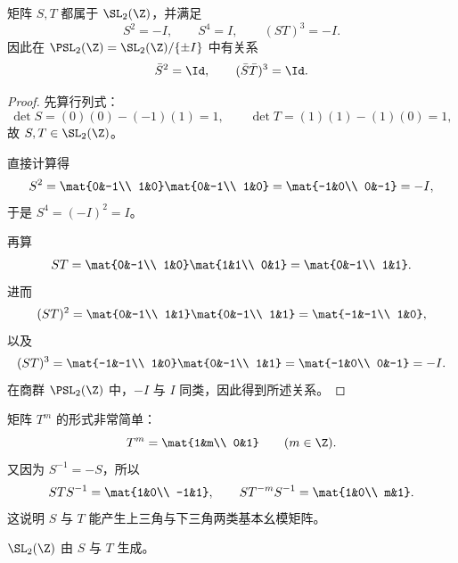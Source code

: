 \begin{proposition}
矩阵 $S,T$ 都属于 $\SL_2(\Z)$，并满足
\[
S^2=-I,
\qquad
S^4=I,
\qquad
(ST)^3=-I.
\]
因此在 $\PSL_2(\Z)=\SL_2(\Z)/\{\pm I\}$ 中有关系
\[
\bar S^2=\Id,
\qquad
(\bar S\bar T)^3=\Id.
\]
\end{proposition}

\begin{proof}
先算行列式：
\[
\det S=(0)(0)-(-1)(1)=1,
\qquad
\det T=(1)(1)-(1)(0)=1,
\]
故 $S,T\in \SL_2(\Z)$。

直接计算得
\[
S^2=
\mat{0&-1\\ 1&0}
\mat{0&-1\\ 1&0}
=
\mat{-1&0\\ 0&-1}
=-I,
\]
于是 $S^4=(-I)^2=I$。

再算
\[
ST=
\mat{0&-1\\ 1&0}
\mat{1&1\\ 0&1}
=
\mat{0&-1\\ 1&1}.
\]
进而
\[
(ST)^2=
\mat{0&-1\\ 1&1}
\mat{0&-1\\ 1&1}
=
\mat{-1&-1\\ 1&0},
\]
以及
\[
(ST)^3=
\mat{-1&-1\\ 1&0}
\mat{0&-1\\ 1&1}
=
\mat{-1&0\\ 0&-1}
=-I.
\]
在商群 $\PSL_2(\Z)$ 中，$-I$ 与 $I$ 同类，因此得到所述关系。
\end{proof}

\begin{example}
矩阵 $T^m$ 的形式非常简单：
\[
T^m=\mat{1&m\\ 0&1}\qquad (m\in\Z).
\]
又因为 $S^{-1}=-S$，所以
\[
STS^{-1}=\mat{1&0\\ -1&1},
\qquad
ST^{-m}S^{-1}=\mat{1&0\\ m&1}.
\]
这说明 $S$ 与 $T$ 能产生上三角与下三角两类基本幺模矩阵。
\end{example}

\begin{theorem}
$\SL_2(\Z)$ 由 $S$ 与 $T$ 生成。
\end{theorem}

